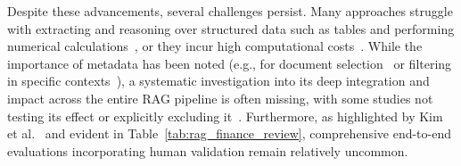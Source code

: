 \documentclass[final,5p,times,twopage,twocolumn,a4paper]{elsarticle}
\begin{document}
Despite these advancements, several challenges persist. Many approaches struggle with extracting and reasoning over structured data such as tables and performing numerical calculations~\cite{iaroshev2024evaluating,setty2024improving,shah2024multi}, or they incur high computational costs~\cite{sarmah2024hybridrag,kim2025optimizingRag,li2024alphafin,lee2024multireranker}. While the importance of metadata has been noted (e.g., for document selection~\cite{lai2024sec} or filtering in specific contexts~\cite{sarmah2023towards}), a systematic investigation into its deep integration and impact across the entire RAG pipeline is often missing, with some studies not testing its effect or explicitly excluding it~\cite{kim2025optimizingRag,setty2024improving,sarmah2024hybridrag}. Furthermore, as highlighted by Kim et al.~\cite{kim2025optimizingRag} and evident in Table~\ref{tab:rag_finance_review}, comprehensive end-to-end evaluations incorporating human validation remain relatively uncommon.
\end{document}
